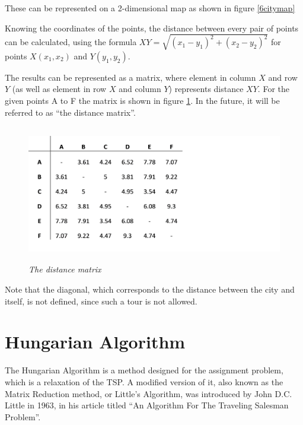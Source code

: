 These can be represented on a 2-dimensional map as shown in figure \ref{6citymap}

\vspace{5mm}

Knowing the coordinates of the points, the distance between every pair of points can be calculated, using the formula $XY=\sqrt{(x_1-y_1)^2+(x_2-y_2)^2}$  for points $X(x_1, x_2)$ and $Y(y_1, y_2)$.

\vspace{5mm}

The results can be represented as a matrix, where element in column $X$ and row $Y$ (as well as element in row $X$ and column $Y$) represents distance $XY$. For the given points A to F the matrix is shown in figure \ref{distancematrix}. In the future, it will be referred to as “the distance matrix”.


\begin{figure}[bh] 
	\centering
	\includegraphics[height=6cm]{distancematrix}
	\caption{\textsl{The distance matrix}}
	\label{distancematrix}
\end{figure}


Note that the diagonal, which corresponds to the distance between the city and itself, is not defined, since such a tour is not allowed.




\section{Hungarian Algorithm}

The Hungarian Algorithm is a method designed for the assignment problem, which is a relaxation of the TSP. A modified version of it, also known as the Matrix Reduction method, or Little’s Algorithm, was introduced by John D.C. Little in 1963, in his article titled “An Algorithm For The Traveling Salesman Problem”.

